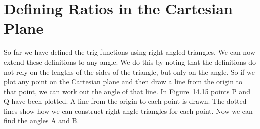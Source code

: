 \section{Defining Ratios in the Cartesian Plane}
\label{m39411*eip-945}
            \nopagebreak
            \label{m39411*eip-156}So far we have defined the trig functions using right angled triangles. We can now extend these definitions to any angle. We do this by noting that the definitions do not rely on the lengths of the sides of the triangle, but only on the angle. So if we plot any point on the Cartesian plane and then draw a line from the origin to that point, we can work out the angle of that line. In Figure~14.15 points P and Q have been plotted. A line from the origin to each point is drawn. The dotted lines show how we can construct right angle triangles for each point. Now we can find the angles A and B.
\par \label{m39411*eip-970}
    \setcounter{subfigure}{0}
